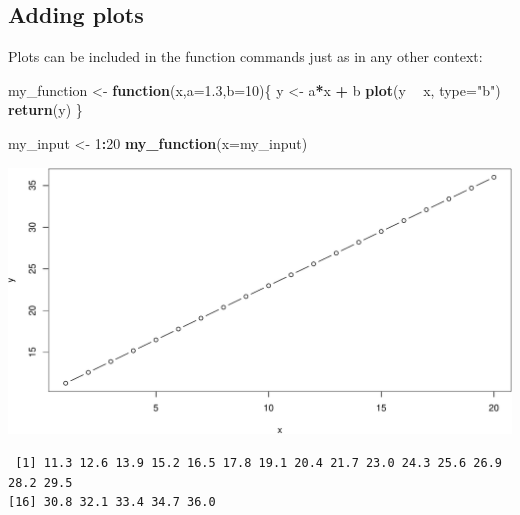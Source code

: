 \documentclass[
]{book}
\newenvironment{Shaded}{\begin{snugshade}}{\end{snugshade}}
\newcommand{\ControlFlowTok}[1]{\textcolor[rgb]{0.13,0.29,0.53}{\textbf{#1}}}
\newcommand{\DataTypeTok}[1]{\textcolor[rgb]{0.13,0.29,0.53}{#1}}
\newcommand{\DecValTok}[1]{\textcolor[rgb]{0.00,0.00,0.81}{#1}}
\newcommand{\FloatTok}[1]{\textcolor[rgb]{0.00,0.00,0.81}{#1}}
\newcommand{\KeywordTok}[1]{\textcolor[rgb]{0.13,0.29,0.53}{\textbf{#1}}}
\newcommand{\NormalTok}[1]{#1}
\newcommand{\OperatorTok}[1]{\textcolor[rgb]{0.81,0.36,0.00}{\textbf{#1}}}
\newcommand{\StringTok}[1]{\textcolor[rgb]{0.31,0.60,0.02}{#1}}
\begin{document}
\hypertarget{adding-plots}{%
\subsection*{Adding plots}\label{adding-plots}}

Plots can be included in the function commands just as in any other context:

\begin{Shaded}
\begin{Highlighting}[]
\NormalTok{my_function <-}\StringTok{ }\ControlFlowTok{function}\NormalTok{(x,}\DataTypeTok{a=}\FloatTok{1.3}\NormalTok{,}\DataTypeTok{b=}\DecValTok{10}\NormalTok{)\{}
\NormalTok{  y <-}\StringTok{ }\NormalTok{a}\OperatorTok{*}\NormalTok{x }\OperatorTok{+}\StringTok{ }\NormalTok{b}
  \KeywordTok{plot}\NormalTok{(y }\OperatorTok{~}\StringTok{ }\NormalTok{x, }\DataTypeTok{type=}\StringTok{"b"}\NormalTok{)}
  \KeywordTok{return}\NormalTok{(y)}
\NormalTok{\}}
\end{Highlighting}
\end{Shaded}

\begin{Shaded}
\begin{Highlighting}[]
\NormalTok{my_input <-}\StringTok{ }\DecValTok{1}\OperatorTok{:}\DecValTok{20}
\KeywordTok{my_function}\NormalTok{(}\DataTypeTok{x=}\NormalTok{my_input)}
\end{Highlighting}
\end{Shaded}

\includegraphics{figures/unnamed-chunk-463-1.pdf}

\begin{verbatim}
 [1] 11.3 12.6 13.9 15.2 16.5 17.8 19.1 20.4 21.7 23.0 24.3 25.6 26.9 28.2 29.5
[16] 30.8 32.1 33.4 34.7 36.0
\end{verbatim}
\end{document}
